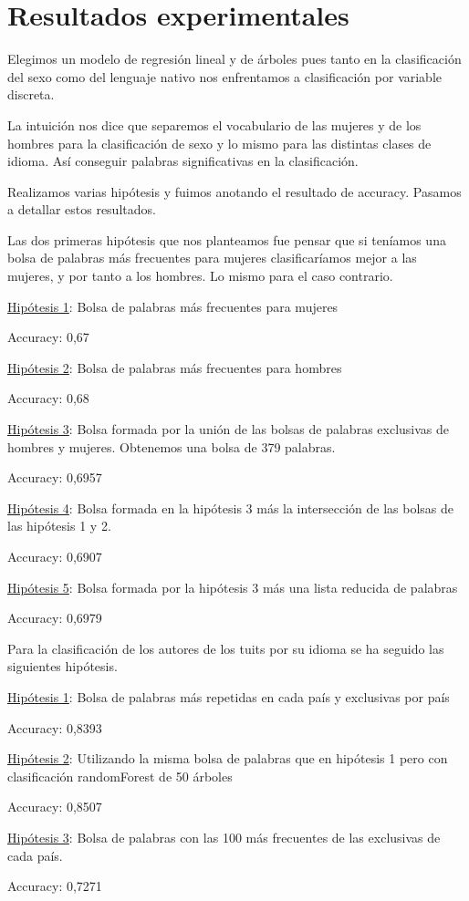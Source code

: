 \documentclass[11pt,a4paper]{article}
\begin{document}
\section{Resultados experimentales}
\justify
Elegimos un modelo de regresi\'on lineal y de \'arboles pues tanto en la clasificaci\'on del sexo como del lenguaje nativo nos enfrentamos a clasificaci\'on por variable discreta. \par\noindent
La intuici\'on nos dice que separemos el vocabulario de las mujeres y de los hombres para la clasificaci\'on de sexo y lo mismo para las distintas clases de idioma. As\'i conseguir palabras significativas en la clasificaci\'on. \par\noindent
Realizamos varias hip\'otesis y fuimos anotando el resultado de accuracy. Pasamos a detallar estos resultados. \par\noindent
Las dos primeras hip\'otesis que nos planteamos fue pensar que si ten\'iamos una bolsa de palabras m\'as frecuentes para mujeres clasificar\'iamos mejor a las mujeres, y por tanto a los hombres. Lo mismo para el caso contrario.\par\noindent
\underline {Hip\'otesis 1}: Bolsa de palabras m\'as frecuentes para mujeres \par\noindent
Accuracy: 0,67 \par\noindent
\underline{Hip\'otesis 2}: Bolsa de palabras m\'as frecuentes para hombres \par\noindent
Accuracy: 0,68 \par\noindent
\underline{Hip\'otesis 3}: Bolsa formada por la uni\'on de las bolsas de palabras exclusivas de hombres y mujeres. Obtenemos una bolsa de 379 palabras. \par\noindent
Accuracy: 0,6957 \par\noindent
\underline{Hip\'otesis 4}: Bolsa formada en la hip\'otesis 3 m\'as la intersecci\'on de las bolsas de las hip\'otesis 1 y 2. \par\noindent
Accuracy: 0,6907 \par\noindent
\underline{Hip\'otesis 5}: Bolsa formada por la hip\'otesis 3 m\'as una lista reducida de palabras \par\noindent
Accuracy: 0,6979 \par\noindent
Para la clasificaci\'on de los autores de los tuits por su idioma se ha seguido las siguientes hip\'otesis.\par\noindent
\underline {Hip\'otesis 1}: Bolsa de palabras m\'as repetidas en cada pa\'is y exclusivas por pa\'is \par\noindent
Accuracy: 0,8393 \par\noindent
\underline {Hip\'otesis 2}: Utilizando la misma bolsa de palabras que en hip\'otesis 1 pero con clasificaci\'on randomForest de 50 \'arboles \par\noindent
Accuracy: 0,8507 \par\noindent
\underline {Hip\'otesis 3}: Bolsa de palabras con las 100 m\'as frecuentes de las exclusivas de cada pa\'is. \par\noindent
Accuracy: 0,7271 
\end{document}
